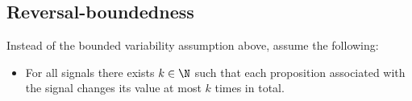 \subsection*{Reversal-boundedness}
Instead of the bounded variability assumption above, assume the following:
\begin{itemize}
	\item For all signals there exists $k \in \N$ such that each proposition associated with the signal changes its value at most $k$ times in total.
\end{itemize}

